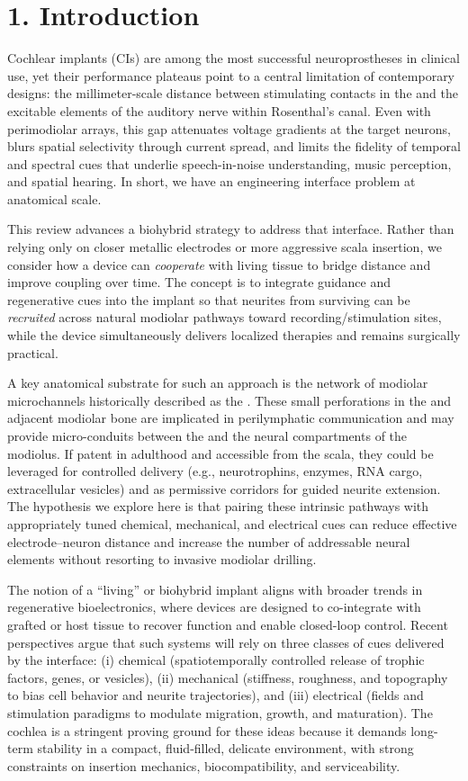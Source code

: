 \section*{1. Introduction}

Cochlear implants (CIs) are among the most successful neuroprostheses in clinical use, yet their performance plateaus point to a central limitation of contemporary designs: the millimeter-scale distance between stimulating contacts in the \ST and the excitable elements of the auditory nerve within Rosenthal's canal. Even with perimodiolar arrays, this gap attenuates voltage gradients at the target neurons, blurs spatial selectivity through current spread, and limits the fidelity of temporal and spectral cues that underlie speech-in-noise understanding, music perception, and spatial hearing. In short, we have an engineering interface problem at anatomical scale.

This review advances a biohybrid strategy to address that interface. Rather than relying only on closer metallic electrodes or more aggressive scala insertion, we consider how a device can \emph{cooperate} with living tissue to bridge distance and improve coupling over time. The concept is to integrate guidance and regenerative cues into the implant so that neurites from surviving \SGNs can be \emph{recruited} across natural modiolar pathways toward recording/stimulation sites, while the device simultaneously delivers localized therapies and remains surgically practical.

A key anatomical substrate for such an approach is the network of modiolar microchannels historically described as the \CPS. These small perforations in the \OSL and adjacent modiolar bone are implicated in perilymphatic communication and may provide micro-conduits between the \ST and the neural compartments of the modiolus. If patent in adulthood and accessible from the scala, they could be leveraged for controlled delivery (e.g., neurotrophins, enzymes, RNA cargo, extracellular vesicles) and as permissive corridors for guided neurite extension. The hypothesis we explore here is that pairing these intrinsic pathways with appropriately tuned chemical, mechanical, and electrical cues can reduce effective electrode--neuron distance and increase the number of addressable neural elements without resorting to invasive modiolar drilling.

The notion of a ``living'' or biohybrid implant aligns with broader trends in regenerative bioelectronics, where devices are designed to co-integrate with grafted or host tissue to recover function and enable closed-loop control. Recent perspectives argue that such systems will rely on three classes of cues delivered by the interface: (i) chemical (spatiotemporally controlled release of trophic factors, genes, or vesicles), (ii) mechanical (stiffness, roughness, and topography to bias cell behavior and neurite trajectories), and (iii) electrical (fields and stimulation paradigms to modulate migration, growth, and maturation).\citep{CarnicerLombarte2024AdvMat} The cochlea is a stringent proving ground for these ideas because it demands long-term stability in a compact, fluid-filled, delicate environment, with strong constraints on insertion mechanics, biocompatibility, and serviceability.

